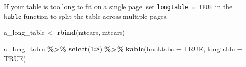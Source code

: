 \documentclass[a4paper, twoside]{templates/ociamthesis}
\newenvironment{Shaded}{\begin{snugshade}}{\end{snugshade}}
\newcommand{\DataTypeTok}[1]{\textcolor[rgb]{0.13,0.29,0.53}{#1}}
\newcommand{\DecValTok}[1]{\textcolor[rgb]{0.00,0.00,0.81}{#1}}
\newcommand{\KeywordTok}[1]{\textcolor[rgb]{0.13,0.29,0.53}{\textbf{#1}}}
\newcommand{\NormalTok}[1]{#1}
\newcommand{\OperatorTok}[1]{\textcolor[rgb]{0.81,0.36,0.00}{\textbf{#1}}}
\newcommand{\OtherTok}[1]{\textcolor[rgb]{0.56,0.35,0.01}{#1}}
\newcommand{\StringTok}[1]{\textcolor[rgb]{0.31,0.60,0.02}{#1}}
\renewenvironment{Shaded}
{
  \vspace{10pt}%
  \begin{snugshade}%
}{%
  \end{snugshade}%
  \vspace{8pt}%
}
\theoremstyle{definition}
\theoremstyle{definition}
\theoremstyle{definition}
\theoremstyle{definition}
\theoremstyle{remark}
\begin{document}
If your table is too long to fit on a single page, set \texttt{longtable\ =\ TRUE} in the \texttt{kable} function to split the table across multiple pages.

\begin{Shaded}
\begin{Highlighting}[]
\NormalTok{a\_long\_table \textless{}{-}}\StringTok{ }\KeywordTok{rbind}\NormalTok{(mtcars, mtcars)}

\NormalTok{a\_long\_table }\OperatorTok{\%\textgreater{}\%}\StringTok{ }
\StringTok{  }\KeywordTok{select}\NormalTok{(}\DecValTok{1}\OperatorTok{:}\DecValTok{8}\NormalTok{) }\OperatorTok{\%\textgreater{}\%}\StringTok{ }
\StringTok{  }\KeywordTok{kable}\NormalTok{(}\DataTypeTok{booktabs =} \OtherTok{TRUE}\NormalTok{, }\DataTypeTok{longtable =} \OtherTok{TRUE}\NormalTok{)}
\end{Highlighting}
\end{Shaded}
\end{document}
